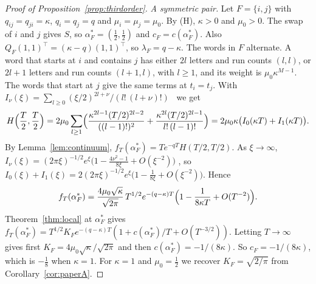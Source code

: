 \begin{proof}[Proof of Proposition~\ref{prop:thirdorder}]
\emph{A symmetric pair.} Let $F=\{i,j\}$ with $q_{ij}=q_{ji}=\kappa$,
$q_i=q_j=q$ and $\mu_i=\mu_j=\mu_0$. By (H), $\kappa>0$ and $\mu_0>0$. The
swap of $i$ and $j$ gives $S$, so $\alpha^*_F=(\frac12,\frac12)$ and
$c_F=c(\alpha^*_F)$. Also $Q_F(1,1)^\top=(\kappa-q)(1,1)^\top$, so
$\lambda_F=q-\kappa$. The words in $F$ alternate. A word that starts at $i$
and contains $j$ has either $2l$ letters and run counts $(l,l)$, or $2l+1$
letters and run counts $(l+1,l)$, with $l\ge1$, and its weight is
$\mu_0\kappa^{M-1}$. The words that start at $j$ give the same terms at
$t_i=t_j$. With
$I_\nu(\xi)=\sum_{l\ge0}(\xi/2)^{2l+\nu}/(l!\,(l+\nu)!)$~\cite[Eq.~10.25.2]{dlmf}
we get
\[
H\Bigl(\frac T2,\frac T2\Bigr)=2\mu_0\sum_{l\ge1}
\Bigl(\frac{\kappa^{2l-1}(T/2)^{2l-2}}{((l-1)!)^2}
+\frac{\kappa^{2l}(T/2)^{2l-1}}{l!\,(l-1)!}\Bigr)
=2\mu_0\kappa\bigl(I_0(\kappa T)+I_1(\kappa T)\bigr).
\]
By Lemma~\ref{lem:continuum}, $f_T(\alpha^*_F)=Te^{-qT}H(T/2,T/2)$. As
$\xi\to\infty$,
$I_\nu(\xi)=(2\pi\xi)^{-1/2}e^\xi\bigl(1-\frac{4\nu^2-1}{8\xi}+O(\xi^{-2})\bigr)$
\cite[Eq.~10.40.1]{dlmf}, so
$I_0(\xi)+I_1(\xi)=2(2\pi\xi)^{-1/2}e^\xi\bigl(1-\frac1{8\xi}+O(\xi^{-2})\bigr)$.
Hence
\[
f_T(\alpha^*_F)=\frac{4\mu_0\sqrt\kappa}{\sqrt{2\pi}}\,T^{1/2}e^{-(q-\kappa)T}
\Bigl(1-\frac1{8\kappa T}+O(T^{-2})\Bigr).
\]
Theorem~\ref{thm:local} at $\alpha^*_F$ gives
$f_T(\alpha^*_F)=T^{1/2}K_Fe^{-(q-\kappa)T}(1+c(\alpha^*_F)/T+O(T^{-3/2}))$.
Letting $T\to\infty$ gives first $K_F=4\mu_0\sqrt\kappa/\sqrt{2\pi}$ and then
$c(\alpha^*_F)=-1/(8\kappa)$. So $c_F=-1/(8\kappa)$, which is $-\frac18$ when
$\kappa=1$. For $\kappa=1$ and $\mu_0=\frac12$ we recover
$K_F=\sqrt{2/\pi}$ from Corollary~\ref{cor:paperA}.


\end{proof}
